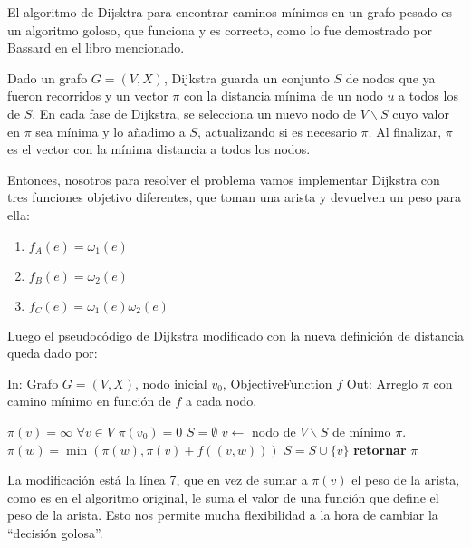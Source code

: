 El algoritmo de Dijsktra para encontrar caminos m\'inimos en un grafo pesado es un algoritmo goloso, que funciona y es correcto, como lo fue demostrado por Bassard en el libro mencionado.

Dado un grafo $G=(V,X)$, Dijkstra guarda un conjunto $S$ de nodos que ya fueron recorridos y un vector $\pi$ con la distancia m\'inima de un nodo $u$ a todos los de $S$. En cada fase de Dijkstra, se selecciona un nuevo nodo de $V\backslash S$ cuyo valor en $\pi$ sea m\'inima y lo a\~nadimo a $S$, actualizando si es necesario $\pi$. Al finalizar, $\pi$ es el vector con la m\'inima distancia a todos los nodos. 

Entonces, nosotros para resolver el problema vamos implementar Dijkstra con tres funciones objetivo diferentes, que toman una arista y devuelven un peso para ella: 

\begin{enumerate}
  \item $f_A(e) = \omega_1(e)$
  \item $f_B(e) = \omega_2(e)$
  \item $f_C(e) = \omega_1(e)\omega_2(e)$
\end{enumerate}

Luego el pseudoc\'odigo de Dijkstra modificado con la nueva definici\'on de distancia queda dado por: 

\begin{algorithm}
In: Grafo $G = (V,X)$, nodo inicial $v_0$, ObjectiveFunction $f$ \newline
Out: Arreglo $\pi$ con camino m\'inimo en funci\'on de $f$ a cada nodo. 
\begin{algorithmic}[1]
\State $\pi(v) = \infty$ \quad $\forall v \in V$
\State $\pi(v_0) = 0$
\State $S = \emptyset$
    \State $v \leftarrow $ nodo de $V\backslash S$ de m\'inimo $\pi$. 
      \State $\pi(w) = \min( \pi(w), \pi(v) + f((v,w)))$
    \EndFor
    \State $S = S \cup \{v\}$
\EndFor
\State \textbf{retornar} $\pi$
\end{algorithmic}
\end{algorithm}

La modificaci\'on est\'a la l\'inea 7, que en vez de sumar a $\pi(v)$ el peso de la arista, como es en el algoritmo original, le suma el valor de una funci\'on que define el peso de la arista. Esto nos permite mucha flexibilidad a la hora de cambiar la ``decisi\'on golosa''.

\clearpage
